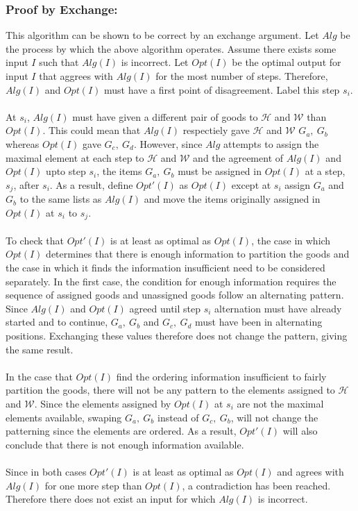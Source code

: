 \documentclass[12pt]{article}
\begin{document}
\subsubsection*{Proof by Exchange:}
This algorithm can be shown to be correct by an exchange argument.
Let $Alg$ be the process by which the above algorithm operates.
Assume there exists some input $I$ such that $Alg(I)$ is incorrect.
Let $Opt(I)$ be the optimal output for input $I$ that aggrees with
$Alg(I)$ for the most number of steps.  Therefore, $Alg(I)$ and $Opt(I)$
must have a first point of disagreement.  Label this step $s_i$.\\\\
At $s_i$, $Alg(I)$ must have given a different pair of goods to
$\mathcal{H}$ and $\mathcal{W}$ than $Opt(I)$.  This could mean that
$Alg(I)$ respectiely gave $\mathcal{H}$ and $\mathcal{W}$ $G_a,\ G_b$      
whereas $Opt(I)$ gave $G_c,\ G_d$.  However, since $Alg$ attempts
to assign the maximal element at each step to $\mathcal{H}$ and 
$\mathcal{W}$ and the agreement of $Alg(I)$ and $Opt(I)$ upto 
step $s_i$, the items $G_a,\ G_b$ must be assigned in $Opt(I)$
at a step, $s_j$, after $s_i$.  As a result, define $Opt'(I)$
as $Opt(I)$ except at $s_i$ assign $G_a$ and $G_b$ to the
same lists as $Alg(I)$ and move the items originally assigned
in $Opt(I)$ at $s_i$ to $s_j$.\\\\
To check that $Opt'(I)$ is at least as optimal as $Opt(I)$,
the case in which $Opt(I)$ determines that there is enough
information to partition the goods and the case in which it
finds the information insufficient need to be considered 
separately.  In the first case, the condition for enough
information requires the sequence of assigned goods and
unassigned goods follow an alternating pattern.  Since 
$Alg(I)$ and $Opt(I)$ agreed until step $s_i$ alternation
must have already started and to continue, $G_a,\ G_b$ and 
$G_c,\ G_d$ must have been in alternating positions.  Exchanging
these values therefore does not change the pattern, giving
the same result.\\\\    
In the case that $Opt(I)$ find the ordering information
insufficient to fairly partition the goods, there will
not be any pattern to the elements assigned to $\mathcal{H}$
and $\mathcal{W}$.  Since the elements assigned by $Opt(I)$ at
$s_i$ are not the maximal elements available, swaping $G_a,\ G_b$
instead of $G_c,\ G_b$, will not change the patterning since
the elements are ordered.  As a result, $Opt'(I)$ will also
conclude that there is not enough information available.\\\\
Since in both cases $Opt'(I)$ is at least as optimal as $Opt(I)$
and agrees with $Alg(I)$ for one more step than $Opt(I)$, a 
contradiction has been reached.  Therefore there does not exist 
an input for which $Alg(I)$ is incorrect.   
\end{document}
